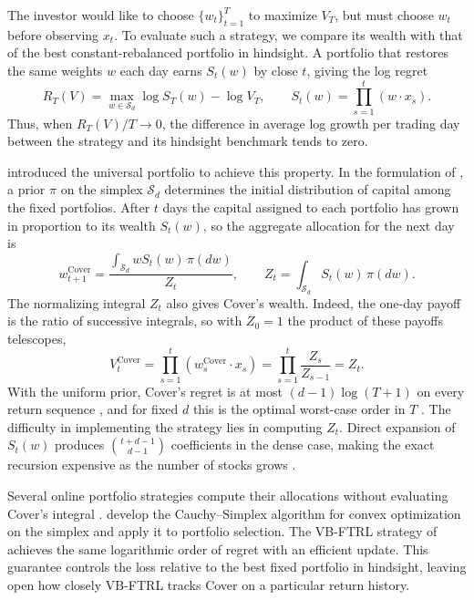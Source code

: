 \documentclass{article}
\numberwithin{equation}{section}
\newcounter{algorithm}
\theoremstyle{remark}
\begin{document}
The investor would like to choose $\{w_t\}_{t=1}^T$ to maximize $V_T$,
but must choose $w_t$ before observing $x_t$. To evaluate such a strategy,
we compare its wealth with that of the best constant-rebalanced portfolio
in hindsight. A portfolio that restores the same weights $w$ each day
earns $S_t(w)$ by close $t$, giving the log regret
\begin{equation}
  R_T(V)=\max_{w\in\mathcal S_d}\log S_T(w)-\log V_T,\qquad
  S_t(w)=\prod_{s=1}^t(w\cdot x_s).
\end{equation}
Thus, when $R_T(V)/T\to0$, the difference in average log growth per trading
day between the strategy and its hindsight benchmark tends to zero.

\citet{cover1991} introduced the universal portfolio to achieve this
property. In the formulation of \citet[Definition~1]{coverordentlich1996},
a prior $\pi$ on the simplex $\mathcal S_d$ determines the initial
distribution of capital among the fixed portfolios. After $t$ days the
capital assigned to each portfolio has grown in
proportion to its wealth $S_t(w)$, so the aggregate allocation for the
next day is
\begin{equation}
  w_{t+1}^\mathrm{Cover} = \frac{\int_{\mathcal S_d} w S_t(w)\,\pi(dw)}{Z_t},
 \qquad Z_t=\int_{\mathcal S_d}S_t(w)\,\pi(dw).
\end{equation}
The normalizing integral $Z_t$ also gives Cover's wealth. Indeed, the
one-day payoff is the ratio of successive integrals, so with $Z_0=1$ the
product of these payoffs telescopes,
\begin{equation}
  V_t^\mathrm{Cover} = \prod_{s=1}^t(w_s^\mathrm{Cover}\cdot x_s)=\prod_{s=1}^t\frac{Z_{s}}{Z_{s-1}}=Z_t.
\end{equation}
With the uniform prior, Cover's regret is at most $(d-1)\log(T+1)$ on
every return sequence \citep[Theorem~1]{coverordentlich1996}, and for
fixed $d$ this is the optimal worst-case order in $T$
\citep{ordentlichcover1998}. The difficulty in implementing the
strategy lies in computing $Z_t$. Direct expansion of $S_t(w)$ produces
$\binom{t+d-1}{d-1}$ coefficients in the dense case, making the exact
recursion expensive as the number of stocks grows
\citep{coverordentlich1996}.

Several online portfolio strategies compute their allocations without
evaluating Cover's integral
\citep{helmbold1998,agarwal2006,hazankale2015,gaivoronskistella2000}.
\citet{chokvasil2025} develop the Cauchy--Simplex algorithm for convex
optimization on the simplex and apply it to portfolio selection.
The VB-FTRL strategy of
\citet{jezequel2026} achieves the same logarithmic order of regret with an
efficient update. This guarantee controls the loss relative to the best fixed
portfolio in hindsight, leaving open how closely VB-FTRL tracks Cover on a
particular return history.
\end{document}
